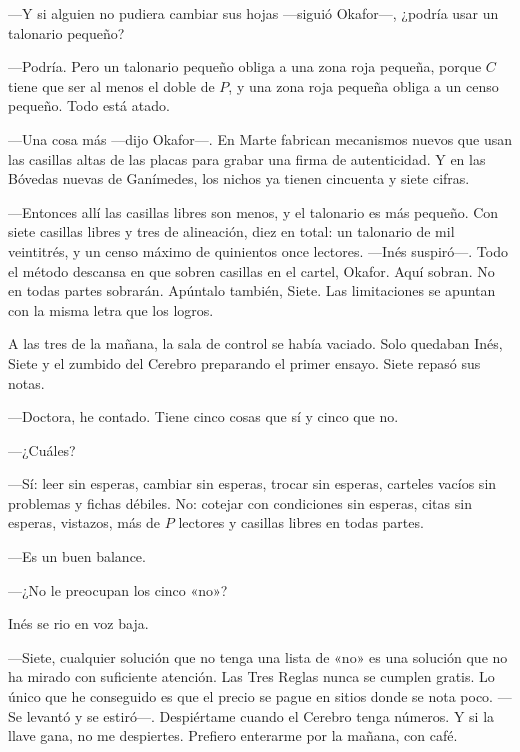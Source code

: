 ---Y si alguien no pudiera cambiar sus hojas ---siguió Okafor---\nobreak, ¿podría usar un talonario pequeño?

---Podría. Pero un talonario pequeño obliga a una zona roja pequeña, porque $C$ tiene que ser al menos el doble de $P$, y una zona roja pequeña obliga a un censo pequeño. Todo está atado.

---Una cosa más ---dijo Okafor---\nobreak. En Marte fabrican mecanismos nuevos que usan las casillas altas de las placas para grabar una firma de autenticidad. Y en las Bóvedas nuevas de Ganímedes, los nichos ya tienen cincuenta y siete cifras.

---Entonces allí las casillas libres son menos, y el talonario es más pequeño. Con siete casillas libres y tres de alineación, diez en total: un talonario de mil veintitrés, y un censo máximo de quinientos once lectores. ---Inés suspiró---\nobreak. Todo el método descansa en que sobren casillas en el cartel, Okafor. Aquí sobran. No en todas partes sobrarán. Apúntalo también, Siete. Las limitaciones se apuntan con la misma letra que los logros.

\escena
A las tres de la mañana, la sala de control se había vaciado. Solo quedaban Inés, Siete y el zumbido del Cerebro preparando el primer ensayo. Siete repasó sus notas.

---Doctora, he contado. Tiene cinco cosas que sí y cinco que no.

---¿Cuáles?

---Sí: leer sin esperas, cambiar sin esperas, trocar sin esperas, carteles vacíos sin problemas y fichas débiles. No: cotejar con condiciones sin esperas, citas sin esperas, vistazos, más de $P$ lectores y casillas libres en todas partes.

---Es un buen balance.

---¿No le preocupan los cinco «no»?

Inés se rio en voz baja.

---Siete, cualquier solución que no tenga una lista de «no» es una solución que no ha mirado con suficiente atención. Las Tres Reglas nunca se cumplen gratis. Lo único que he conseguido es que el precio se pague en sitios donde se nota poco. ---Se levantó y se estiró---\nobreak. Despiértame cuando el Cerebro tenga números. Y si la llave gana, no me despiertes. Prefiero enterarme por la mañana, con café.
